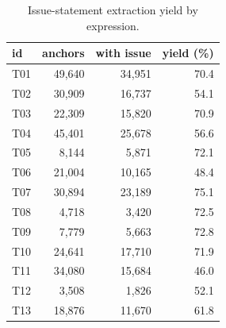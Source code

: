 \begin{table}[t]
\centering\small
\begin{tabular}{lrrr}
\toprule
id & anchors & with issue & yield (\%) \\
\midrule
T01 & 49,640 & 34,951 & 70.4 \\
T02 & 30,909 & 16,737 & 54.1 \\
T03 & 22,309 & 15,820 & 70.9 \\
T04 & 45,401 & 25,678 & 56.6 \\
T05 & 8,144 & 5,871 & 72.1 \\
T06 & 21,004 & 10,165 & 48.4 \\
T07 & 30,894 & 23,189 & 75.1 \\
T08 & 4,718 & 3,420 & 72.5 \\
T09 & 7,779 & 5,663 & 72.8 \\
T10 & 24,641 & 17,710 & 71.9 \\
T11 & 34,080 & 15,684 & 46.0 \\
T12 & 3,508 & 1,826 & 52.1 \\
T13 & 18,876 & 11,670 & 61.8 \\
\bottomrule
\end{tabular}
\caption{Issue-statement extraction yield by expression.}
\label{tab:extract}
\end{table}
